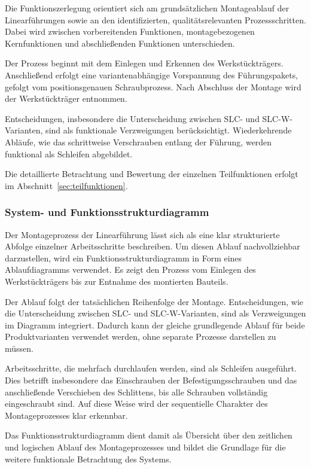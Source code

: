 Die Funktionszerlegung orientiert sich am grundsätzlichen Montageablauf der Linearführungen sowie an den identifizierten, qualitätsrelevanten Prozessschritten. Dabei wird zwischen vorbereitenden Funktionen, montagebezogenen Kernfunktionen und abschließenden Funktionen unterschieden.

Der Prozess beginnt mit dem Einlegen und Erkennen des Werkstückträgers. Anschließend erfolgt eine variantenabhängige Vorspannung des Führungspakets, gefolgt vom positionsgenauen Schraubprozess. Nach Abschluss der Montage wird der Werkstückträger entnommen.

Entscheidungen, insbesondere die Unterscheidung zwischen SLC- und SLC-W-Varianten, sind als funktionale Verzweigungen berücksichtigt. Wiederkehrende Abläufe, wie das schrittweise Verschrauben entlang der Führung, werden funktional als Schleifen abgebildet.

Die detaillierte Betrachtung und Bewertung der einzelnen Teilfunktionen erfolgt im Abschnitt~\ref{sec:teilfunktionen}.

\subsubsection{System- und Funktionsstrukturdiagramm}
Der Montageprozess der Linearführung lässt sich als eine klar strukturierte Abfolge einzelner Arbeitsschritte beschreiben. Um diesen Ablauf nachvollziehbar darzustellen, wird ein Funktionsstrukturdiagramm in Form eines Ablaufdiagramms verwendet. Es zeigt den Prozess vom Einlegen des Werkstückträgers bis zur Entnahme des montierten Bauteils.

Der Ablauf folgt der tatsächlichen Reihenfolge der Montage. Entscheidungen, wie die Unterscheidung zwischen SLC- und SLC-W-Varianten, sind als Verzweigungen im Diagramm integriert. Dadurch kann der gleiche grundlegende Ablauf für beide Produktvarianten verwendet werden, ohne separate Prozesse darstellen zu müssen.

Arbeitsschritte, die mehrfach durchlaufen werden, sind als Schleifen ausgeführt. Dies betrifft insbesondere das Einschrauben der Befestigungsschrauben und das anschließende Verschieben des Schlittens, bis alle Schrauben vollständig eingeschraubt sind. Auf diese Weise wird der sequentielle Charakter des Montageprozesses klar erkennbar.

Das Funktionsstrukturdiagramm dient damit als Übersicht über den zeitlichen und logischen Ablauf des Montageprozesses und bildet die Grundlage für die weitere funktionale Betrachtung des Systems.

